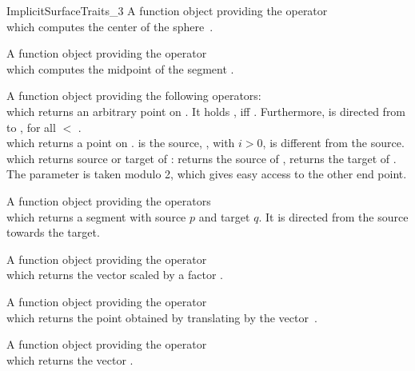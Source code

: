 \begin{ccRefConcept}{ImplicitSurfaceTraits_3}
{A function object providing the operator\\
 which computes the center of
the sphere~.}

{A function object providing the operator\\
 which computes
the midpoint of the segment .}

{A function object providing the following operators:\\
   which returns an
  arbitrary point on . It holds , iff
  . Furthermore, is directed from  to
  , for all  $<$ .\\
   which returns a point on
  .  is the source, , with
  $i>0$, is different from the source. \\
   which returns source
  or target of :  returns the source of ,
   returns the target of . The parameter
   is taken modulo 2, which gives easy access to the other end
  point.
}

{A function object providing the operators\\
   which
  returns a segment with source $p$ and target $q$. It is directed from the
  source towards the target.}

{A function object providing the operator\\
 which returns
the vector  scaled by a factor .}

{A function object providing the operator\\
 which returns
the point obtained by translating  by the vector~.}

{A function object providing the operator\\
 which returns
the vector .}


\end{ccRefConcept}

